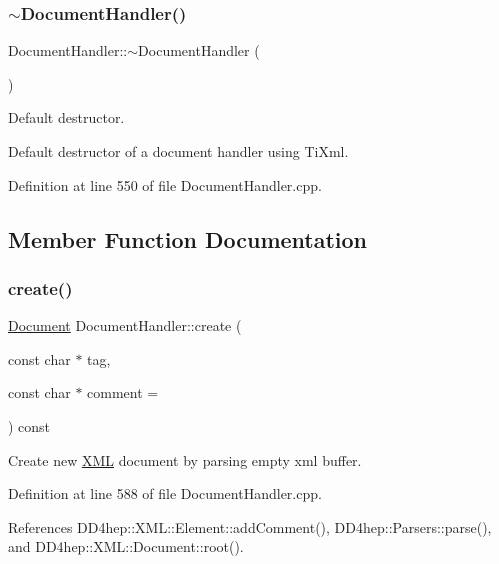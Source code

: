 \subsubsection{\texorpdfstring{$\sim$\+Document\+Handler()}{~DocumentHandler()}}
{\footnotesize\ttfamily Document\+Handler\+::$\sim$\+Document\+Handler (\begin{DoxyParamCaption}{ }\end{DoxyParamCaption})\hspace{0.3cm}{\ttfamily [virtual]}}



Default destructor. 

Default destructor of a document handler using Ti\+Xml. 

Definition at line 550 of file Document\+Handler.\+cpp.



\subsection{Member Function Documentation}
\hypertarget{class_d_d4hep_1_1_x_m_l_1_1_document_handler_ae45dceae6f7dd6e2cd90978ee24807c6}{}\label{class_d_d4hep_1_1_x_m_l_1_1_document_handler_ae45dceae6f7dd6e2cd90978ee24807c6} 
\subsubsection{\texorpdfstring{create()}{create()}}
{\footnotesize\ttfamily \hyperlink{class_d_d4hep_1_1_x_m_l_1_1_document}{Document} Document\+Handler\+::create (\begin{DoxyParamCaption}\item[{const char $\ast$}]{tag,  }\item[{const char $\ast$}]{comment = {} }\end{DoxyParamCaption}) const}



Create new \hyperlink{namespace_d_d4hep_1_1_x_m_l}{X\+ML} document by parsing empty xml buffer. 



Definition at line 588 of file Document\+Handler.\+cpp.



References D\+D4hep\+::\+X\+M\+L\+::\+Element\+::add\+Comment(), D\+D4hep\+::\+Parsers\+::parse(), and D\+D4hep\+::\+X\+M\+L\+::\+Document\+::root().



